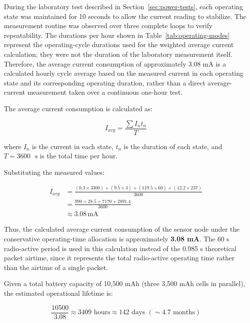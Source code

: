 During the laboratory test described in Section~\ref{sec:power-tests}, each operating state was maintained for 10 seconds to allow the current reading to stabilize. The measurement routine was observed over three complete loops to verify repeatability. The durations per hour shown in Table~\ref{tab:operating-modes} represent the operating-cycle durations used for the weighted average current calculation; they were not the duration of the laboratory measurement itself. Therefore, the average current consumption of approximately 3.08 mA is a calculated hourly cycle average based on the measured current in each operating state and its corresponding operating duration, rather than a direct average-current measurement taken over a continuous one-hour test.

The average current consumption is calculated as:

\begin{equation}
I_{avg} = \frac{\sum I_{n}t_{n}}{T}
\label{eq:average-current}
\end{equation}

where \(I_{n}\) is the current in each state, \(t_{n}\) is the duration of
each state, and \(T = 3600\text{ }\text{s}\) is the total time per hour.

Substituting the measured values:

\begin{equation}
\begin{aligned}
I_{avg} &=
\frac{(0.3 \times 3300) + (9.5 \times 3) + (119.5 \times 60)
+ (12.2 \times 237)}{3600} \\
&= \frac{990 + 28.5 + 7170 + 2891.4}{3600} \\
&\approx 3.08\,\text{mA}
\end{aligned}
\label{eq:average-current-substitution}
\end{equation}

Thus, the calculated average current consumption of the sensor node under
the conservative operating-time allocation is approximately \textbf{3.08 mA}. The 60 s radio-active period is used in this calculation instead of the 0.985 s theoretical packet airtime, since it represents the total radio-active operating time rather than the airtime of a single packet.

Given a total battery capacity of 10,500 mAh (three 3,500 mAh cells in
parallel), the estimated operational lifetime is:

\begin{equation}
\frac{10500}{3.08} \approx 3409\text{~hours} \approx 142\text{~days~}( \sim 4.7\text{~months})
\label{eq:three-cell-lifetime}
\end{equation}

